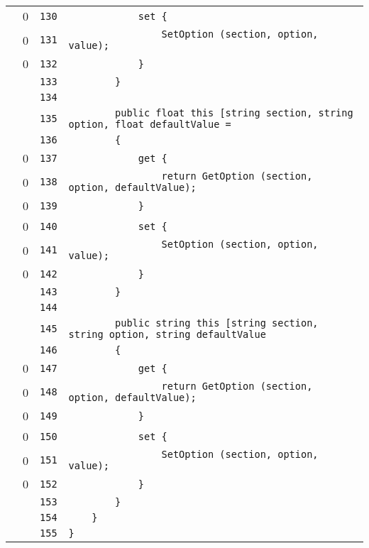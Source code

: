 \documentclass[a4paper,10pt]{article}
\begin{document}
\begin{longtable}[l]{lrrl}
\cellcolor{red} & 0 & \verb~130~ & \verb~            set {~\\
\cellcolor{red} & 0 & \verb~131~ & \verb~                SetOption (section, option, value);~\\
\cellcolor{red} & 0 & \verb~132~ & \verb~            }~\\
\cellcolor{gray} &  & \verb~133~ & \verb~        }~\\
\cellcolor{gray} &  & \verb~134~ & \verb~~\\
\cellcolor{gray} &  & \verb~135~ & \verb~        public float this [string section, string option, float defaultValue =~\\
\cellcolor{gray} &  & \verb~136~ & \verb~        {~\\
\cellcolor{red} & 0 & \verb~137~ & \verb~            get {~\\
\cellcolor{red} & 0 & \verb~138~ & \verb~                return GetOption (section, option, defaultValue);~\\
\cellcolor{red} & 0 & \verb~139~ & \verb~            }~\\
\cellcolor{red} & 0 & \verb~140~ & \verb~            set {~\\
\cellcolor{red} & 0 & \verb~141~ & \verb~                SetOption (section, option, value);~\\
\cellcolor{red} & 0 & \verb~142~ & \verb~            }~\\
\cellcolor{gray} &  & \verb~143~ & \verb~        }~\\
\cellcolor{gray} &  & \verb~144~ & \verb~~\\
\cellcolor{gray} &  & \verb~145~ & \verb~        public string this [string section, string option, string defaultValue~\\
\cellcolor{gray} &  & \verb~146~ & \verb~        {~\\
\cellcolor{red} & 0 & \verb~147~ & \verb~            get {~\\
\cellcolor{red} & 0 & \verb~148~ & \verb~                return GetOption (section, option, defaultValue);~\\
\cellcolor{red} & 0 & \verb~149~ & \verb~            }~\\
\cellcolor{red} & 0 & \verb~150~ & \verb~            set {~\\
\cellcolor{red} & 0 & \verb~151~ & \verb~                SetOption (section, option, value);~\\
\cellcolor{red} & 0 & \verb~152~ & \verb~            }~\\
\cellcolor{gray} &  & \verb~153~ & \verb~        }~\\
\cellcolor{gray} &  & \verb~154~ & \verb~    }~\\
\cellcolor{gray} &  & \verb~155~ & \verb~}~\\
\end{longtable}
\newpage
\end{document}
